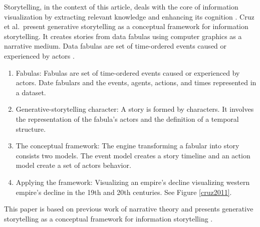 \documentclass{egpubl}
\begin{document}
Storytelling, in the context of this article, deals with the core of information visualization by extracting relevant knowledge and enhancing its cognition \cite{cruz2011}.
Cruz et al.\ present generative storytelling as a conceptual framework for information storytelling. It creates stories from data fabulas using computer graphics as a narrative medium. Data fabulas are set of time-ordered events caused or experienced by actors \cite{cruz2011}. 

\begin{enumerate}
\item Fabulas: Fabulas are set of time-ordered events caused or experienced by actors. Date fabulars and the events, agents, actions, and times represented in a dataset.
\item Generative-storytelling character: A story is formed by characters. It involves the representation of the fabula's actors and the definition of a temporal structure.
\item The conceptual framework: The engine transforming a fabular into story consists two models. The event model creates a story timeline and an action model create a set of actors behavior.
\item Applying the framework: Visualizing an empire's decline visualizing western empire's decline in the 19th and 20th centuries. See Figure \ref{cruz2011}.
\end{enumerate}
This paper is based on  previous work of narrative theory\cite{naratology1985} and presents generative storytelling as a conceptual framework for information storytelling \cite{cruz2011}.
\end{document}
